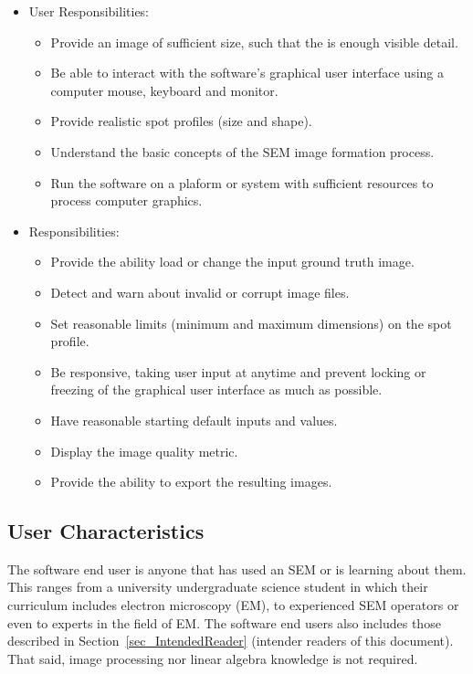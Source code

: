 \documentclass[12pt]{article}
\begin{document}
\begin{itemize}

  \item User Responsibilities:
  \begin{itemize}
    \item Provide an image of sufficient size, such that the is enough visible detail.
    \item Be able to interact with the software's graphical user interface using a computer mouse, keyboard and monitor.
    \item Provide realistic spot profiles (size and shape).
    \item Understand the basic concepts of the SEM image formation process.
    \item Run the software on a plaform or system with sufficient resources to process computer graphics.
  \end{itemize}

  \item \progname{} Responsibilities:
  \begin{itemize}
    \item Provide the ability load or change the input ground truth image.
    \item Detect and warn about invalid or corrupt image files.
    \item Set reasonable limits (minimum and maximum dimensions) on the spot profile. 
    \item Be responsive, taking user input at anytime and prevent locking or freezing of the graphical user interface as much as possible.
    \item Have reasonable starting default inputs and values.
    \item Display the image quality metric.
    \item Provide the ability to export the resulting images.
  \end{itemize}

\end{itemize}

\subsection{User Characteristics} \label{SecUserCharacteristics}

The \progname{} software end user is anyone that has used an SEM or is learning about them. This ranges from a university undergraduate science student in which their curriculum includes electron microscopy (EM), to experienced SEM operators or even to experts in the field of EM. The software end users also includes those described in Section~\ref{sec_IntendedReader} (intender readers of this document). That said, image processing nor linear algebra knowledge is not required. 
\end{document}

